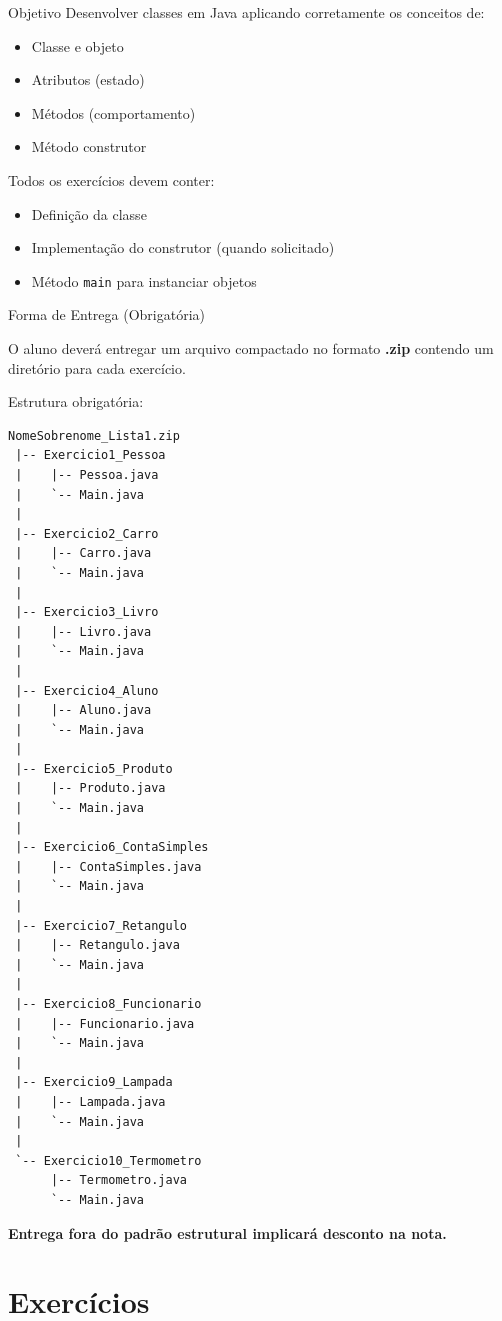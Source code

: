 \documentclass[12pt]{article}
\begin{document}
\begin{block}{Objetivo}
Desenvolver classes em Java aplicando corretamente os conceitos de:
\begin{itemize}
    \item Classe e objeto
    \item Atributos (estado)
    \item Métodos (comportamento)
    \item Método construtor
\end{itemize}

Todos os exercícios devem conter:
\begin{itemize}
    \item Definição da classe
    \item Implementação do construtor (quando solicitado)
    \item Método \texttt{main} para instanciar objetos
\end{itemize}
\end{block}
\begin{block}{Forma de Entrega (Obrigatória)}

O aluno deverá entregar um arquivo compactado no formato \textbf{.zip}
contendo um diretório para cada exercício.

Estrutura obrigatória:
\begin{verbatim}
NomeSobrenome_Lista1.zip  
 |-- Exercicio1_Pessoa
 |    |-- Pessoa.java
 |    `-- Main.java
 |
 |-- Exercicio2_Carro
 |    |-- Carro.java
 |    `-- Main.java
 |
 |-- Exercicio3_Livro
 |    |-- Livro.java
 |    `-- Main.java
 |
 |-- Exercicio4_Aluno
 |    |-- Aluno.java
 |    `-- Main.java
 |
 |-- Exercicio5_Produto
 |    |-- Produto.java
 |    `-- Main.java
 |
 |-- Exercicio6_ContaSimples
 |    |-- ContaSimples.java
 |    `-- Main.java
 |
 |-- Exercicio7_Retangulo
 |    |-- Retangulo.java
 |    `-- Main.java
 |
 |-- Exercicio8_Funcionario
 |    |-- Funcionario.java
 |    `-- Main.java
 |
 |-- Exercicio9_Lampada
 |    |-- Lampada.java
 |    `-- Main.java
 |
 `-- Exercicio10_Termometro
      |-- Termometro.java
      `-- Main.java
\end{verbatim}


\textbf{Entrega fora do padrão estrutural implicará desconto na nota.}

\end{block}

\section*{Exercícios}
\end{document}
